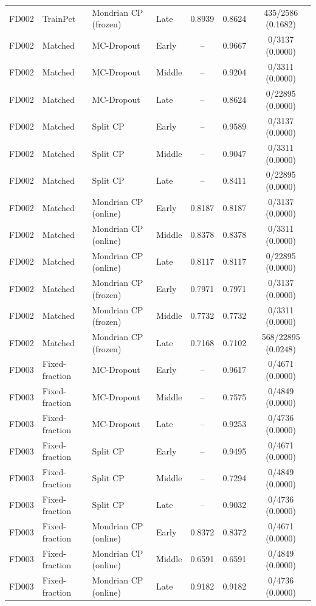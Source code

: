 \begin{table}[t]
\begin{tabular}{llllccc}
FD002 & TrainPct & Mondrian CP (frozen) & Late & 0.8939 & 0.8624 & 435/2586 (0.1682) \\
FD002 & Matched & MC-Dropout & Early & -- & 0.9667 & 0/3137 (0.0000) \\
FD002 & Matched & MC-Dropout & Middle & -- & 0.9204 & 0/3311 (0.0000) \\
FD002 & Matched & MC-Dropout & Late & -- & 0.8624 & 0/22895 (0.0000) \\
FD002 & Matched & Split CP & Early & -- & 0.9589 & 0/3137 (0.0000) \\
FD002 & Matched & Split CP & Middle & -- & 0.9047 & 0/3311 (0.0000) \\
FD002 & Matched & Split CP & Late & -- & 0.8411 & 0/22895 (0.0000) \\
FD002 & Matched & Mondrian CP (online) & Early & 0.8187 & 0.8187 & 0/3137 (0.0000) \\
FD002 & Matched & Mondrian CP (online) & Middle & 0.8378 & 0.8378 & 0/3311 (0.0000) \\
FD002 & Matched & Mondrian CP (online) & Late & 0.8117 & 0.8117 & 0/22895 (0.0000) \\
FD002 & Matched & Mondrian CP (frozen) & Early & 0.7971 & 0.7971 & 0/3137 (0.0000) \\
FD002 & Matched & Mondrian CP (frozen) & Middle & 0.7732 & 0.7732 & 0/3311 (0.0000) \\
FD002 & Matched & Mondrian CP (frozen) & Late & 0.7168 & 0.7102 & 568/22895 (0.0248) \\
FD003 & Fixed-fraction & MC-Dropout & Early & -- & 0.9617 & 0/4671 (0.0000) \\
FD003 & Fixed-fraction & MC-Dropout & Middle & -- & 0.7575 & 0/4849 (0.0000) \\
FD003 & Fixed-fraction & MC-Dropout & Late & -- & 0.9253 & 0/4736 (0.0000) \\
FD003 & Fixed-fraction & Split CP & Early & -- & 0.9495 & 0/4671 (0.0000) \\
FD003 & Fixed-fraction & Split CP & Middle & -- & 0.7294 & 0/4849 (0.0000) \\
FD003 & Fixed-fraction & Split CP & Late & -- & 0.9032 & 0/4736 (0.0000) \\
FD003 & Fixed-fraction & Mondrian CP (online) & Early & 0.8372 & 0.8372 & 0/4671 (0.0000) \\
FD003 & Fixed-fraction & Mondrian CP (online) & Middle & 0.6591 & 0.6591 & 0/4849 (0.0000) \\
FD003 & Fixed-fraction & Mondrian CP (online) & Late & 0.9182 & 0.9182 & 0/4736 (0.0000) \\

\end{tabular}
\end{table}

